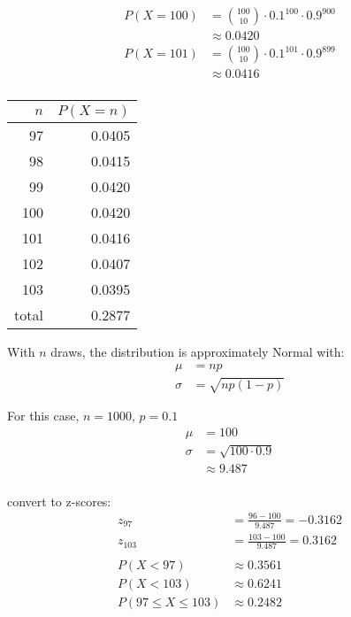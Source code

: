 \documentclass[landscape]{exam}
\begin{document}
  \begin{align*}
    P(X = 100)  & = \binom{100}{10} \cdot 0.1^{100} \cdot 0.9^{900} \\
              & \approx 0.0420 \\
    P(X = 101) & = \binom{100}{10} \cdot 0.1^{101} \cdot 0.9^{899} \\
              & \approx 0.0416 \\
  \end{align*}

  \begin{tabular}[H]{rr}
    \toprule
    $n$ & $P(X = n)$ \\
    \midrule
    97    & 0.0405 \\
    98    & 0.0415 \\
    99    & 0.0420 \\
    100   & 0.0420 \\
    101   & 0.0416 \\
    102   & 0.0407 \\
    103   & 0.0395 \\
    \midrule
    total & 0.2877 \\
    \bottomrule
  \end{tabular}

  With $n$ draws, the distribution is approximately Normal with:
  \begin{align*}
    \mu    & = np \\
    \sigma & = \sqrt{np(1 -p)}
  \end{align*}

  For this case, $n = 1000$, $p = 0.1$
  \begin{align*}
    \mu    & = 100 \\
    \sigma & = \sqrt{100 \cdot 0.9} \\
           & \approx 9.487 \\
  \end{align*}

  convert to z-scores:
  \begin{align*}
    z_{97}  & = \frac{96 - 100}{9.487} = -0.3162 \\
    z_{103} & = \frac{103 - 100}{9.487} = 0.3162 \\
    \\
    P(X < 97)             & \approx 0.3561 \\
    P(X < 103)            & \approx 0.6241 \\
    P(97 \leq X \leq 103) & \approx 0.2482 \\
  \end{align*}
\end{document}
